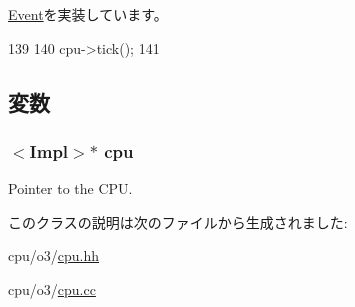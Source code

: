 \hyperlink{classEvent_a142b75b68a6291400e20fb0dd905b1c8}{Event}を実装しています。


\begin{DoxyCode}
139 {
140     cpu->tick();
141 }
\end{DoxyCode}


\subsection{変数}
\hypertarget{classFullO3CPU_1_1TickEvent_a3a3767255bcefd2ce55f94976ab8eb99}{
\subsubsection[{cpu}]{$<$Impl$>$$\ast$ {\bf cpu}}}
\label{classFullO3CPU_1_1TickEvent_a3a3767255bcefd2ce55f94976ab8eb99}
Pointer to the CPU. 

このクラスの説明は次のファイルから生成されました:\begin{DoxyCompactItemize}
\item 
cpu/o3/\hyperlink{o3_2cpu_8hh}{cpu.hh}\item 
cpu/o3/\hyperlink{o3_2cpu_8cc}{cpu.cc}\end{DoxyCompactItemize}
